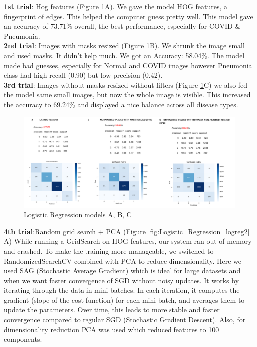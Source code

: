 \documentclass{article}
\begin{document}
\textbf{1st trial}: Hog features (Figure \ref{fig:Logistic_Regression}A). We gave the model HOG features, a fingerprint of edges. This helped the computer guess pretty well.
This model gave an accuracy of 73.71\% overall, the best performance, especially for COVID \& Pneumonia.
\\
\textbf{2nd trial}: Images with masks resized (Figure \ref{fig:Logistic_Regression}B). We shrunk the image small and used masks. It didn’t help much.
We got an Accuracy: 58.04\%. The model made bad guesses, especially for Normal and COVID images however Pneumonia class had high recall (0.90) but low precision (0.42).
\\
\textbf{3rd trial}: Images without masks resized without filters (Figure \ref{fig:Logistic_Regression}C) we also fed the model same small images, but now the whole image is visible. This increased the accuracy to 69.24\%  and displayed a nice balance across all disease types.
\\
\begin{figure}[H] %
    \centering
    \includegraphics[width=1.0\linewidth]{lr1,2,3.png}
    \caption{Logistic Regression models A, B, C}
    \label{fig:Logistic_Regression}
\end{figure}
\textbf{4th trial}:Random grid search + PCA (Figure \ref{fig:Logistic_Regression_logreg2} A)
While running a GridSearch on HOG features, our system ran out of memory and crashed. To make the training more manageable, we switched to RandomizedSearchCV combined with PCA to reduce dimensionality.
Here we used SAG (Stochastic Average Gradient) which is ideal for large datasets and when we want faster convergence of SGD without noisy updates. It works by iterating through the data in mini-batches. In each iteration, it computes the gradient (slope of the cost function) for each mini-batch, and averages them to update the parameters. Over time, this leads to more stable and faster convergence compared to regular SGD (Stochastic Gradient Descent). Also, for dimensionality reduction PCA was used which reduced features to 100 components.
\end{document}
